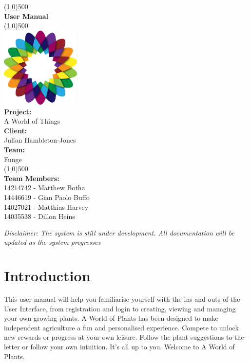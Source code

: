 \documentclass{article}
\begin{document}
\begin{titlepage}
	\begin{center}
		\line(1,0){500}\\
		[6mm]
		\huge{\bfseries User Manual}\\
		\line(1,0){500}\\
		[5mm]
		\includegraphics[width=150px]{../images/AWorldOfPlants.png}
		\\
		[5mm]
		\large\textbf{Project:}\\A World of Things\\
		[3mm]
		\large\textbf{Client:}\\Julian Hambleton-Jones\\
		[3mm]
		\large \textbf{Team:}\\Funge\\
		\line(1,0){500}\\
		[5mm]
		\large \textbf{Team Members:}\\
		[3mm]
		\large 14214742 - Matthew Botha\\
		\large 14446619 - Gian Paolo Buffo\\
		\large 14027021 - Matthias Harvey\\
        \large 14035538 - Dillon Heins\\[3mm]
	\end{center}
\end{titlepage}

\cleardoublepage
\thispagestyle{empty}
\tableofcontents
\cleardoublepage
\setcounter{page}{1}

\textit{Disclaimer: The system is still under development. All documentation will be updated as the system progresses}

\section{Introduction}
	This user manual will help you familiarise yourself with the ins and outs of the User Interface, from registration and login to creating, viewing and managing your own growing plants.
	A World of Plants has been designed to make independent agriculture a fun and personalised experience. Compete to unlock new rewards or progress at your own leisure. Follow the plant suggestions to-the-letter or follow your own intuition. It's all up to you.
	Welcome to A World of Plants. 
	
\end{document}
